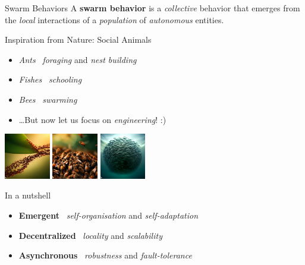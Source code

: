\documentclass[presentation, 9pt]{beamer}\mode<presentation>{\usetheme{AMSBolognaFC}}
\begin{document}
\begin{frame}{Swarm Behaviors}
A \textbf{swarm behavior} is a \emph{collective} behavior that emerges from the \emph{local} interactions of a \emph{population} of \emph{autonomous} entities.
\begin{block}{Inspiration from Nature: Social Animals}
\begin{itemize}
	\item \emph{Ants} \faArrowRight \, \emph{foraging} and \emph{nest building}
	\item \emph{Fishes} \faArrowRight \, \emph{schooling}
	\item \emph{Bees} \faArrowRight \, \emph{swarming}
	\item \dots But now let us focus on \emph{engineering}! :)
\end{itemize}
\end{block}

\centering
\includegraphics[width=0.15\textwidth]{img/ants.jpeg}
\includegraphics[width=0.15\textwidth]{img/bee.jpeg}
\includegraphics[width=0.15\textwidth]{img/fishes.jpeg}

\begin{alertblock}{In a nutshell}
\begin{itemize}
	\item \textbf{Emergent} \faArrowRight \, \emph{self-organisation} and \emph{self-adaptation}
	\item \textbf{Decentralized} \faArrowRight \, \emph{locality} and \emph{scalability}
	\item \textbf{Asynchronous} \faArrowRight \, \emph{robustness} and \emph{fault-tolerance}
\end{itemize}	
\end{alertblock}
\end{frame}
\end{document}
